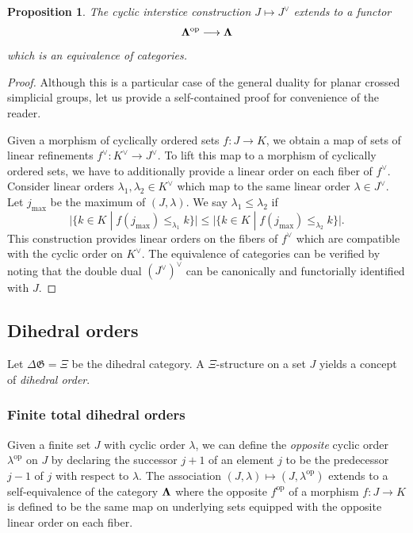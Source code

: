 \documentclass[english,11pt,leqno]{article}
\def\Gen{\mathfrak{G}}
\def\lra{\longrightarrow}
\def\op{{\operatorname{op}}}
\newtheorem{prop}[thm]{Proposition}
\theoremstyle{definition}
\theoremstyle{remark}
\numberwithin{equation}{section}
\begin{document}
\begin{prop}
\label{prop:cyclic-interstice} The cyclic interstice construction $J \mapsto J^{\vee}$ extends to a functor
	\[
		{\bf \Lambda}^{\op} \lra {\bf \Lambda}
	\]
	which is an equivalence of categories.
\end{prop}
\begin{proof} Although this is a particular case of the general duality for planar crossed
	simplicial groups, let us provide a self-contained proof for convenience of the reader. 

 	Given a morphism of cyclically ordered sets $f: J \to K$, we obtain a map of sets of linear
	refinements $f^{\vee}: K^{\vee} \to J^{\vee}$. To lift this map to a morphism of cyclically ordered sets,
	we have to additionally provide a linear order on each fiber of $f^{\vee}$. Consider linear
	orders $\lambda_1, \lambda_2 \in K^{\vee}$ which map to the same linear order $\lambda \in
	J^{\vee}$. Let $j_{\max}$ be the maximum of $(J, \lambda)$. We say $\lambda_1 \le \lambda_2$ if
	\[
		\big|\{k \in K\; |\; f(j_{\max}) \le_{\lambda_1} k\}\big| \le \big|\{k \in K \;|\; f(j_{\max})
		\le_{\lambda_2} k\}\big|.
	\]
	This construction provides linear orders on the fibers of $f^{\vee}$
	which are compatible with the cyclic order on $K^{\vee}$. The equivalence of categories can
	be verified by noting that the double dual $(J^{\vee})^{\vee}$ can be canonically and
	functorially identified with $J$.
\end{proof}


   
   

\subsection{Dihedral orders}\label{sec:dihorder}

Let $\Delta \Gen = \Xi$ be the dihedral category. A $\Xi$-structure on a set $J$ yields a
concept of {\em dihedral order}. 

\subsubsection{Finite total dihedral orders}

Given a finite set $J$ with cyclic order $\lambda$, we can define the {\em opposite} cyclic order
$\lambda^{\op}$ on $J$ by declaring the successor $j+1$ of an element $j$ to be the predecessor 
$j-1$ of $j$ with respect to $\lambda$. The association $(J,\lambda) \mapsto (J, \lambda^{\op})$ extends to a self-equivalence of the
category $\bf \Lambda$ where the opposite $f^{\op}$ of a morphism $f: J \to K$ is defined to be the
same map on underlying sets equipped with the opposite linear order on each fiber.
\end{document}
